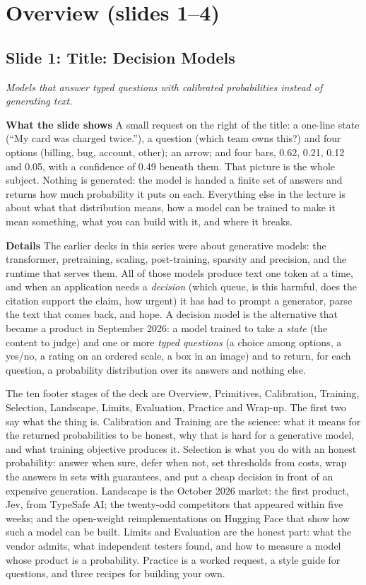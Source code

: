 \documentclass[11pt,letterpaper]{article}
\newcommand{\slide}[3]{%
  \subsection[Slide #1: #2]{Slide #1: #2}%
  {\color{muted}\itshape #3\par}\medskip}
\newcommand{\para}[1]{\medskip\noindent\textbf{#1}\quad}
\begin{document}
\section{Overview (slides 1--4)}

\slide{1}{Title: Decision Models}{Models that answer typed questions with calibrated probabilities instead of generating text.}

\para{What the slide shows} A small request on the right of the title: a one-line state (``My card was charged twice.''), a question (which team owns this?) and four options (billing, bug, account, other); an arrow; and four bars, 0.62, 0.21, 0.12 and 0.05, with a confidence of 0.49 beneath them. That picture is the whole subject. Nothing is generated: the model is handed a finite set of answers and returns how much probability it puts on each. Everything else in the lecture is about what that distribution means, how a model can be trained to make it mean something, what you can build with it, and where it breaks.

\para{Details} The earlier decks in this series were about generative models: the transformer, pretraining, scaling, post-training, sparsity and precision, and the runtime that serves them. All of those models produce text one token at a time, and when an application needs a \emph{decision} (which queue, is this harmful, does the citation support the claim, how urgent) it has had to prompt a generator, parse the text that comes back, and hope. A decision model is the alternative that became a product in September 2026: a model trained to take a \emph{state} (the content to judge) and one or more \emph{typed questions} (a choice among options, a yes/no, a rating on an ordered scale, a box in an image) and to return, for each question, a probability distribution over its answers and nothing else.

The ten footer stages of the deck are Overview, Primitives, Calibration, Training, Selection, Landscape, Limits, Evaluation, Practice and Wrap-up. The first two say what the thing is. Calibration and Training are the science: what it means for the returned probabilities to be honest, why that is hard for a generative model, and what training objective produces it. Selection is what you do with an honest probability: answer when sure, defer when not, set thresholds from costs, wrap the answers in sets with guarantees, and put a cheap decision in front of an expensive generation. Landscape is the October 2026 market: the first product, Jev, from TypeSafe AI; the twenty-odd competitors that appeared within five weeks; and the open-weight reimplementations on Hugging Face that show how such a model can be built. Limits and Evaluation are the honest part: what the vendor admits, what independent testers found, and how to measure a model whose product is a probability. Practice is a worked request, a style guide for questions, and three recipes for building your own.
\end{document}
